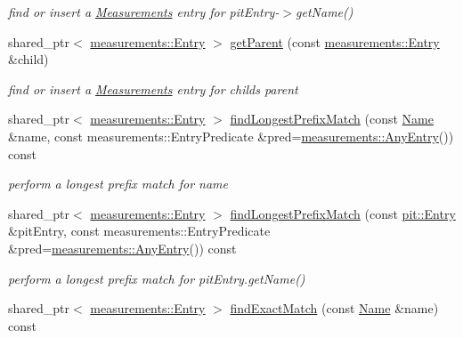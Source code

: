 \begin{DoxyCompactItemize}
\begin{DoxyCompactList}\small\item\em find or insert a \hyperlink{classnfd_1_1Measurements}{Measurements} entry for {\ttfamily pit\+Entry-\/$>$get\+Name()} \end{DoxyCompactList}\item 
shared\+\_\+ptr$<$ \hyperlink{classnfd_1_1measurements_1_1Entry}{measurements\+::\+Entry} $>$ \hyperlink{classnfd_1_1MeasurementsAccessor_a69f66065db34c7fc3fa46300dea4e4b0}{get\+Parent} (const \hyperlink{classnfd_1_1measurements_1_1Entry}{measurements\+::\+Entry} \&child)
\begin{DoxyCompactList}\small\item\em find or insert a \hyperlink{classnfd_1_1Measurements}{Measurements} entry for child\textquotesingle{}s parent \end{DoxyCompactList}\item 
shared\+\_\+ptr$<$ \hyperlink{classnfd_1_1measurements_1_1Entry}{measurements\+::\+Entry} $>$ \hyperlink{classnfd_1_1MeasurementsAccessor_aa244902affa67ba73fd821bd5b7a76ae}{find\+Longest\+Prefix\+Match} (const \hyperlink{classndn_1_1Name}{Name} \&name, const measurements\+::\+Entry\+Predicate \&pred=\hyperlink{classnfd_1_1measurements_1_1AnyEntry}{measurements\+::\+Any\+Entry}()) const\hypertarget{classnfd_1_1MeasurementsAccessor_aa244902affa67ba73fd821bd5b7a76ae}{}\label{classnfd_1_1MeasurementsAccessor_aa244902affa67ba73fd821bd5b7a76ae}

\begin{DoxyCompactList}\small\item\em perform a longest prefix match for {\ttfamily name} \end{DoxyCompactList}\item 
shared\+\_\+ptr$<$ \hyperlink{classnfd_1_1measurements_1_1Entry}{measurements\+::\+Entry} $>$ \hyperlink{classnfd_1_1MeasurementsAccessor_ac91f8ee72b4e5a2c8c7ecba0fc33f671}{find\+Longest\+Prefix\+Match} (const \hyperlink{classnfd_1_1pit_1_1Entry}{pit\+::\+Entry} \&pit\+Entry, const measurements\+::\+Entry\+Predicate \&pred=\hyperlink{classnfd_1_1measurements_1_1AnyEntry}{measurements\+::\+Any\+Entry}()) const\hypertarget{classnfd_1_1MeasurementsAccessor_ac91f8ee72b4e5a2c8c7ecba0fc33f671}{}\label{classnfd_1_1MeasurementsAccessor_ac91f8ee72b4e5a2c8c7ecba0fc33f671}

\begin{DoxyCompactList}\small\item\em perform a longest prefix match for {\ttfamily pit\+Entry.\+get\+Name()} \end{DoxyCompactList}\item 
shared\+\_\+ptr$<$ \hyperlink{classnfd_1_1measurements_1_1Entry}{measurements\+::\+Entry} $>$ \hyperlink{classnfd_1_1MeasurementsAccessor_a6d6572aac99b3a24feb0ef8dd382eb69}{find\+Exact\+Match} (const \hyperlink{classndn_1_1Name}{Name} \&name) const\hypertarget{classnfd_1_1MeasurementsAccessor_a6d6572aac99b3a24feb0ef8dd382eb69}{}\label{classnfd_1_1MeasurementsAccessor_a6d6572aac99b3a24feb0ef8dd382eb69}


\end{DoxyCompactItemize}

